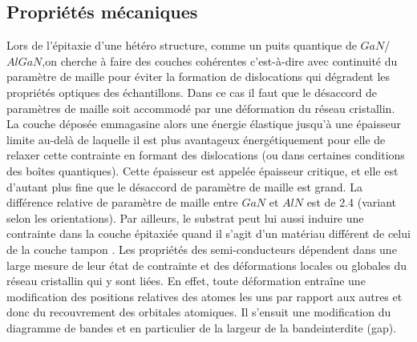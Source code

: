 \subsection{Propriétés mécaniques}
Lors de l’épitaxie d’une hétéro structure, comme un puits quantique de $ GaN $/$ AlGaN $,on cherche à faire des couches cohérentes c'est-à-dire avec continuité du paramètre de maille pour éviter la formation de dislocations qui dégradent les propriétés optiques des échantillons. Dans ce cas il faut que le désaccord de paramètres de maille soit accommodé par une déformation du réseau cristallin. La couche déposée emmagasine alors une énergie élastique  jusqu’à une épaisseur limite au-delà de laquelle il est plus avantageux énergétiquement pour elle de relaxer cette contrainte en formant des dislocations (ou dans certaines conditions des boîtes quantiques). Cette épaisseur est appelée épaisseur critique, et elle est d’autant plus fine que le désaccord de paramètre de maille est grand. La différence relative de paramètre de maille entre $ GaN $ et $ AlN $ est de 2.4 (variant selon les orientations). Par ailleurs, le substrat peut lui aussi induire une contrainte dans la couche épitaxiée quand il s’agit d’un matériau différent de celui de la couche tampon \cite{a17}. Les propriétés des semi-conducteurs dépendent dans une large mesure de leur état de contrainte et des déformations locales ou globales du réseau cristallin qui y sont liées. En effet, toute déformation entraîne une modification des positions relatives des atomes les uns par rapport aux autres et donc du recouvrement des orbitales atomiques. Il s’ensuit une modification du diagramme de bandes et en particulier de la largeur de la bandeinterdite (gap). 

